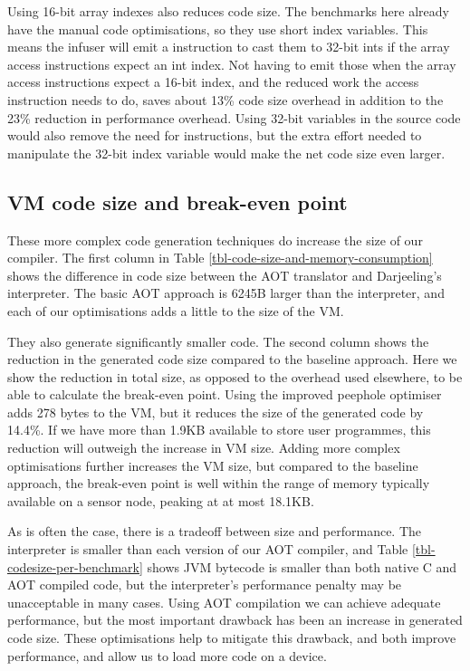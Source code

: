 Using 16-bit array indexes also reduces code size. The benchmarks here already have the manual code optimisations, so they use short index variables. This means the infuser will emit a  instruction to cast them to 32-bit ints if the array access instructions expect an int index. Not having to emit those when the array access instructions expect a 16-bit index, and the reduced work the access instruction needs to do, saves about 13\% code size overhead in addition to the 23\% reduction in performance overhead. Using 32-bit variables in the source code would also remove the need for  instructions, but the extra effort needed to manipulate the 32-bit index variable would make the net code size even larger.

\subsection{VM code size and break-even point}
These more complex code generation techniques do increase the size of our compiler. The first column in Table \ref{tbl-code-size-and-memory-consumption} shows the difference in code size between the AOT translator and Darjeeling's interpreter. The basic AOT approach is 6245B larger than the interpreter, and each of our optimisations adds a little to the size of the VM.

They also generate significantly smaller code. The second column shows the reduction in the generated code size compared to the baseline approach. Here we show the reduction in total size, as opposed to the overhead used elsewhere, to be able to calculate the break-even point. Using the improved peephole optimiser adds 278 bytes to the VM, but it reduces the size of the generated code by 14.4\%. If we have more than 1.9KB available to store user programmes, this reduction will outweigh the increase in VM size. Adding more complex optimisations further increases the VM size, but compared to the baseline approach, the break-even point is well within the range of memory typically available on a sensor node, peaking at at most 18.1KB.

As is often the case, there is a tradeoff between size and performance. The interpreter is smaller than each version of our AOT compiler, and Table \ref{tbl-codesize-per-benchmark} shows JVM bytecode is smaller than both native C and AOT compiled code, but the interpreter's performance penalty may be unacceptable in many cases. Using AOT compilation we can achieve adequate performance, but the most important drawback has been an increase in generated code size. These optimisations help to mitigate this drawback, and both improve performance, and allow us to load more code on a device.

